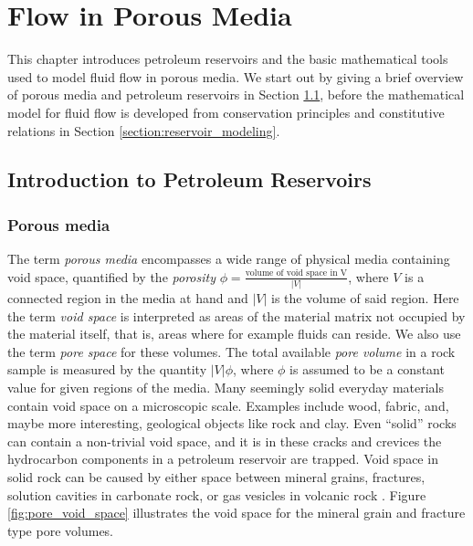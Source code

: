 \chapter{Flow in Porous Media} \thispagestyle{chapterpage}
\label{chapter:flow_porous_media}
This chapter introduces petroleum reservoirs and the basic mathematical tools used to model fluid flow in porous media. We start out by giving a brief overview of porous media and petroleum reservoirs in Section \ref{section:introduction_petroleum_reservoirs}, before the mathematical model for fluid flow is developed from conservation principles and constitutive relations in Section \ref{section:reservoir_modeling}.

\section{Introduction to Petroleum Reservoirs}
\label{section:introduction_petroleum_reservoirs}

\subsection{Porous media}
The term \emph{porous media} encompasses a wide range of physical media containing void space, quantified by the \emph{porosity} $\phi = \frac{\text{volume of void space in V}}{|V|}$, where $V$ is a connected region in the media at hand and $\vert V \vert$ is the volume of said region. Here the term \emph{void space} is interpreted as areas of the material matrix not occupied by the material itself, that is, areas where for example fluids can reside.  We also use the term \emph{pore space} for these volumes. The total available \emph{pore volume} in a rock sample is measured by the quantity $\vert V \vert\phi$, where $\phi$ is assumed to be a constant value for given regions of the media. Many seemingly solid everyday materials contain void space on a microscopic scale. Examples include wood, fabric, and, maybe more interesting, geological objects like rock and clay. Even ``solid'' rocks can contain a non-trivial void space, and it is in these cracks and crevices the hydrocarbon components in a petroleum reservoir are trapped. Void space in solid rock can be caused by either space between mineral grains, fractures, solution cavities in carbonate rock, or gas vesicles in volcanic rock \citep{jain_ch._2013}. Figure \ref{fig:pore_void_space} illustrates the void space for the mineral grain and fracture type pore volumes.

